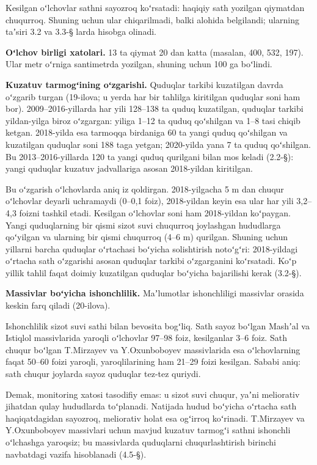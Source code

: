 \documentclass[14pt,a4paper,oneside]{extreport}
\begin{document}
Kesilgan oʻlchovlar sathni sayozroq koʻrsatadi: haqiqiy sath yozilgan
qiymatdan chuqurroq. Shuning uchun ular chiqarilmadi, balki alohida
belgilandi; ularning taʼsiri 3.2 va 3.3-§ larda hisobga olinadi.

\textbf{Oʻlchov birligi xatolari.} 13 ta qiymat 20 dan katta (masalan,
400, 532, 197). Ular metr oʻrniga santimetrda yozilgan, shuning uchun
100 ga boʻlindi.

\textbf{Kuzatuv tarmogʻining oʻzgarishi.} Quduqlar tarkibi kuzatilgan
davrda oʻzgarib turgan (19-ilova; u yerda har bir tahlilga kiritilgan
quduqlar soni ham bor). 2009--2016-yillarda har yili 128--138 ta quduq
kuzatilgan, quduqlar tarkibi yildan-yilga biroz oʻzgargan: yiliga 1--12
ta quduq qoʻshilgan va 1--8 tasi chiqib ketgan. 2018-yilda esa tarmoqqa
birdaniga 60 ta yangi quduq qoʻshilgan va kuzatilgan quduqlar soni 188
taga yetgan; 2020-yilda yana 7 ta quduq qoʻshilgan. Bu
2013--2016-yillarda 120 ta yangi quduq qurilgani bilan mos keladi
(2.2-§): yangi quduqlar kuzatuv jadvallariga asosan 2018-yildan
kiritilgan.

Bu oʻzgarish oʻlchovlarda aniq iz qoldirgan. 2018-yilgacha 5 m dan
chuqur oʻlchovlar deyarli uchramaydi (0--0,1 foiz), 2018-yildan keyin
esa ular har yili 3,2--4,3 foizni tashkil etadi. Kesilgan oʻlchovlar
soni ham 2018-yildan koʻpaygan. Yangi quduqlarning bir qismi sizot suvi
chuqurroq joylashgan hududlarga qoʻyilgan va ularning bir qismi
chuqurroq (4--6 m) qurilgan. Shuning uchun yillarni barcha quduqlar
oʻrtachasi boʻyicha solishtirish notoʻgʻri: 2018-yildagi oʻrtacha sath
oʻzgarishi asosan quduqlar tarkibi oʻzgarganini koʻrsatadi. Koʻp yillik
tahlil faqat doimiy kuzatilgan quduqlar boʻyicha bajarilishi kerak
(3.2-§).

\textbf{Massivlar boʻyicha ishonchlilik.} Maʼlumotlar ishonchliligi
massivlar orasida keskin farq qiladi (20-ilova).

Ishonchlilik sizot suvi sathi bilan bevosita bogʻliq. Sath sayoz boʻlgan
Mashʼal va Istiqlol massivlarida yaroqli oʻlchovlar 97--98 foiz,
kesilganlar 3--6 foiz. Sath chuqur boʻlgan T.Mirzayev va Y.Oxunboboyev
massivlarida esa oʻlchovlarning faqat 50--60 foizi yaroqli,
yaroqlilarining ham 21--29 foizi kesilgan. Sababi aniq: sath chuqur
joylarda sayoz quduqlar tez-tez quriydi.

Demak, monitoring xatosi tasodifiy emas: u sizot suvi chuqur, yaʼni
meliorativ jihatdan qulay hududlarda toʻplanadi. Natijada hudud boʻyicha
oʻrtacha sath haqiqatdagidan sayozroq, meliorativ holat esa ogʻirroq
koʻrinadi. T.Mirzayev va Y.Oxunboboyev massivlari uchun mavjud kuzatuv
tarmogʻi sathni ishonchli oʻlchashga yaroqsiz; bu massivlarda quduqlarni
chuqurlashtirish birinchi navbatdagi vazifa hisoblanadi (4.5-§).
\end{document}
